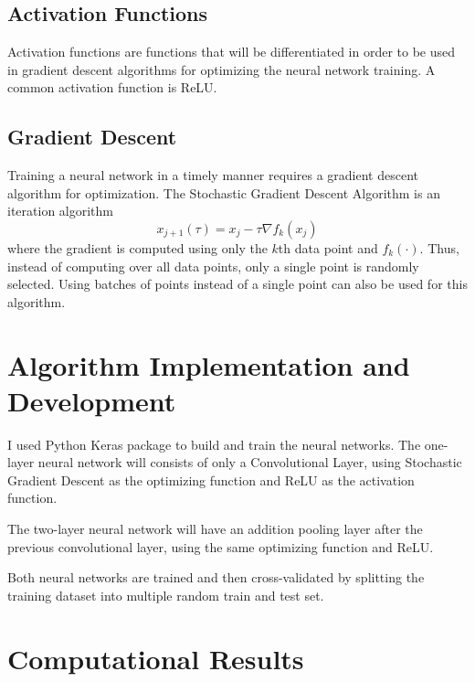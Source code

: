 \documentclass[12pt, a4paper]{article}
\begin{document}
\subsection{Activation Functions}
Activation functions are functions that will be differentiated in order to be used in gradient descent algorithms for optimizing the neural network training. A common activation function is ReLU.

\subsection{Gradient Descent}
Training a neural network in a timely manner requires a gradient descent algorithm for optimization. The Stochastic Gradient Descent Algorithm is an iteration algorithm
$$x_{j+1}(\tau) = x_j - \tau \nabla f_k (x_j)$$
where the gradient is computed using only the $k$th data point and $f_k(\cdot)$. Thus, instead of computing over all data points, only a single point is randomly selected. Using batches of points instead of a single point can also be used for this algorithm.

\section{Algorithm Implementation and Development}
I used Python Keras package to build and train the neural networks. The one-layer neural network will consists of only a Convolutional Layer, using Stochastic Gradient Descent as the optimizing function and ReLU as the activation function. 

The two-layer neural network will have an addition pooling layer after the previous convolutional layer, using the same optimizing function and ReLU.

Both neural networks are trained and then cross-validated by splitting the training dataset into multiple random train and test set.

\section{Computational Results}
\end{document}
